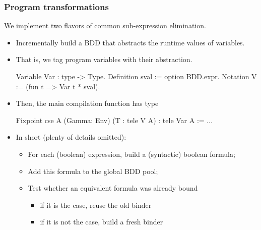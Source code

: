 \documentclass[9pt]{beamer}
\begin{document}
\begin{frame}[fragile]
  \frametitle{Program transformations}
  We implement two flavors of common sub-expression elimination. 
  \begin{itemize}
  \item Incrementally build a BDD that abstracts the runtime values of variables.
  \item That is, we \alert{tag} program variables with their abstraction.
\begin{coq}
Variable Var : type -> Type.
Definition sval := option BDD.expr.
Notation V := (fun t => Var t * sval).
\end{coq}
\item Then, the main compilation function has type
\begin{coq}
Fixpoint cse {A} (Gamma: Env) (T : tele V A) : tele Var A := ...
\end{coq}
\pause
\item In short (plenty of details omitted):
  \begin{itemize}
  \item For each (boolean) expression, build a (syntactic) boolean formula;
  \item Add this formula to the global BDD pool;
  \item Test whether an equivalent formula was already bound
    \begin{itemize}
    \item if it is the case, reuse the old binder
    \item if it is not the case, build a fresh binder
    \end{itemize}
  \end{itemize}
\end{itemize}
\end{frame}
\end{document}
